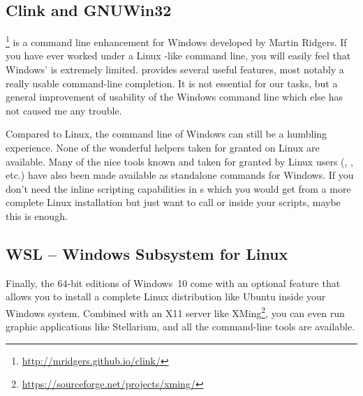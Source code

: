\subsection{Clink and GNUWin32}
\label{sec:landscapes:clink}

\footnote{\url{http://mridgers.github.io/clink/}} is a command
line enhancement for Windows developed by Martin Ridgers. If you have
ever worked under a Linux -like command line, you will
easily feel that Windows'  is extremely limited. 
provides several useful features, most notably a really usable
command-line completion. It is not essential for our tasks, but a
general improvement of usability of the Windows command line which
else has not caused me any trouble.

Compared to Linux, the command line of Windows can still be a humbling
experience. None of the wonderful helpers taken for granted on Linux
are available.  Many of the nice tools known and taken for granted by
Linux users (, ,  etc.) have
also been made available as standalone commands for Windows. If you
don't need the inline scripting capabilities in s which
you would get from a more complete Linux installation but just want to
call  or  inside your 
scripts, maybe this is enough.

\subsection{WSL -- Windows Subsystem for Linux}
\label{sec:landscapes:WSL}

Finally, the 64-bit editions of Windows~10 come with an optional
feature that allows you to install a complete Linux distribution like
Ubuntu inside your Windows system. Combined with an X11 server like
XMing\footnote{\url{https://sourceforge.net/projects/xming/}}, you can
even run graphic applications like Stellarium, and all the
command-line tools are available.



